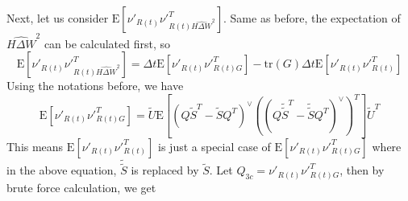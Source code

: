 \documentclass[10pt]{article}
\newcommand{\tr}[1]{\ensuremath{\mathrm{tr}\left( #1 \right)}}
\newcommand{\expect}[1]{\ensuremath{\mathrm{E}\left[ #1 \right]}}
\begin{document}
Next, let us consider $\expect{\nu'_{R(t)}\nu'^T_{R(t)\widehat{H\Delta W}^2}}$.
Same as before, the expectation of $\widehat{H\Delta W}^2$ can be calculated first, so
\begin{equation}
	\expect{\nu'_{R(t)}\nu'^T_{R(t)\widehat{H\Delta W}^2}} = \Delta t\expect{\nu'_{R(t)}\nu'^T_{R(t)G}} - \tr{G}\Delta t\expect{\nu'_{R(t)}\nu'^T_{R(t)}}
\end{equation}
Using the notations before, we have
\begin{equation}
	\expect{\nu'_{R(t)}\nu'^T_{R(t)G}} = \tilde{U}\expect{\left( Q\tilde{S}^T-\tilde{S}Q^T \right)^\vee \left(\left( Q\tilde{\tilde{S}}^T-\tilde{\tilde{S}}Q^T \right)^\vee\right)^T }\tilde{U}^T
\end{equation}
This means $\expect{\nu'_{R(t)}\nu'^T_{R(t)}}$ is just a special case of $\expect{\nu'_{R(t)}\nu'^T_{R(t)G}}$ where in the above equation, $\tilde{\tilde{S}}$ is replaced by $\tilde{S}$.
Let $Q_{3c} = \nu'_{R(t)}\nu'^T_{R(t)G}$, then by brute force calculation, we get
\end{document}
